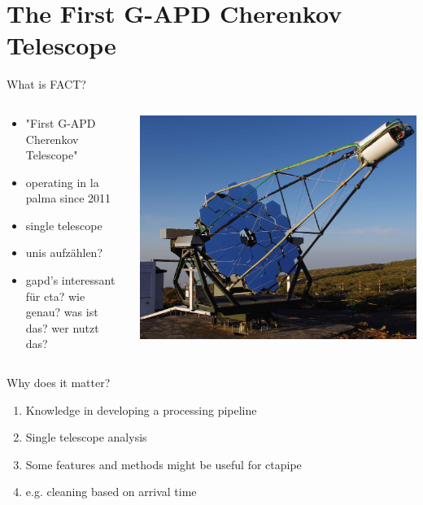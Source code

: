 \section{The First G-APD Cherenkov Telescope}

\begin{frame}{What is FACT?}
    \begin{columns}[T] %
        \begin{column}{.45\textwidth}
            \vspace{10pt}
            \begin{itemize}
                \item "First G-APD Cherenkov Telescope"
                \item operating in la palma since 2011
                \item single telescope
                \item unis aufzählen?
                \item gapd's interessant für cta? wie genau? was ist das? wer nutzt das?
            \end{itemize}
        \end{column}
        \begin{column}{.48\textwidth}
            \includegraphics[width=\linewidth]{images/fact_telescope.jpg}
            \cite{Anderhub_2013}
        \end{column}
    \end{columns}
\end{frame}

\begin{frame}{Why does it matter?}
    \begin{enumerate}
        \item Knowledge in developing a processing pipeline 
        \item Single telescope analysis 
        \item Some features and methods might be useful for ctapipe
        \item e.g. cleaning based on arrival time
    \end{enumerate}
\end{frame}